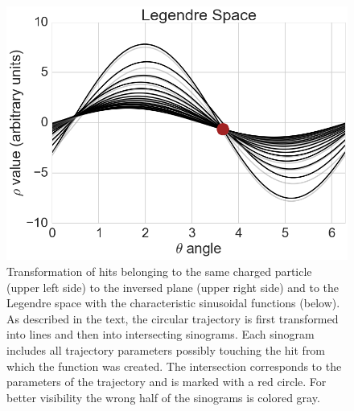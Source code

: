 \begin{figure}
 \vspace*{1cm}
 \includegraphics[scale=0.3]{figures/theory/legendre_3.png}
 \caption[Axial Legendre algorithm.]{Transformation of hits belonging to the same charged particle (upper left side) to the inversed plane (upper right side) and to the Legendre space with the characteristic sinusoidal functions (below). As described in the text, the circular trajectory is first transformed into lines and then into intersecting sinograms. Each sinogram includes all trajectory parameters possibly touching the hit from which the function was created. The intersection corresponds to the parameters of the trajectory and is marked with a red circle. For better visibility the wrong half of the sinograms is colored gray.}
 \label{fig-legendre-explained}
\end{figure}

